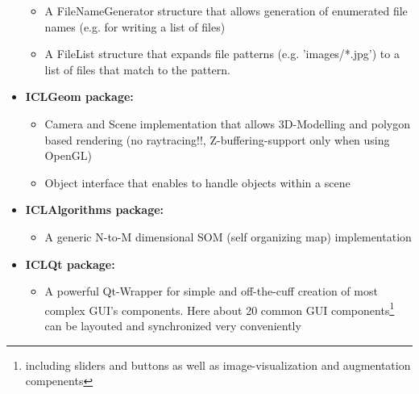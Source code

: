\begin{itemize}
\begin{itemize}
        \item A FileNameGenerator structure that allows generation of enumerated file names (e.g. for writing a list of files)\\

        \item A FileList structure that expands file patterns (e.g. 'images/*.jpg') to a list of files that match to the pattern.\\
\end{itemize}


\item \textbf{ICLGeom package:} \\
\begin{itemize}
        \item Camera and Scene implementation that allows 3D-Modelling and polygon based rendering (no raytracing!!, Z-buffering-support only when using OpenGL) \\
              

        \item Object interface that enables to handle objects within a scene\\
\end{itemize}

\item \textbf{ICLAlgorithms package:} \\
\begin{itemize}
        \item A generic N-to-M dimensional SOM (self organizing map) implementation\\
         
\end{itemize}

\item \textbf{ICLQt package:} \\
\begin{itemize}
        \item A powerful Qt-Wrapper for simple and off-the-cuff creation of most complex GUI's components. Here about 20 common GUI components\footnote{including sliders and buttons as well as image-visualization and augmentation compenents} can be layouted and synchronized very conveniently\\


\end{itemize}
\end{itemize}
